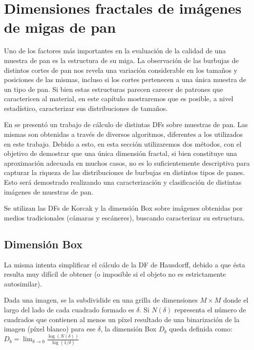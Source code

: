 \section{Dimensiones fractales de imágenes de migas de pan}

Uno de los factores más importantes en la evaluación de la calidad de una muestra de pan es la estructura de su miga.
La observación de las burbujas de distintos cortes de pan nos revela una variación considerable en los tamaños y posiciones de las mismas, incluso si los cortes pertenecen a una única muestra de un tipo de pan.
Si bien estas estructuras parecen carecer de patrones que caractericen al material, en este capítulo mostraremos que es posible, a nivel estadístico, caracterizar sus distribuciones de tamaños.

En \cite{Gonzales2008} se present\'o un trabajo de c\'alculo de distintas DFs sobre muestras de pan.
Las mismas son obtenidas a trav\'es de diversos algoritmos, diferentes a los utilizados en este trabajo.
Debido a esto, en esta sección utilizaremos dos métodos, con el objetivo de demostrar que una única dimensión fractal, si bien constituye una aproximación adecuada en muchos casos, no es lo suficientemente descriptiva para capturar la riqueza de las distribuciones de burbujas en distintos tipos de panes.
Esto será demostrado realizando una caracterización y clasificación de distintas imágenes de muestras de pan. 

Se utilizan las DFs de Korcak \cite{Mandelbrot1983} y la dimensi\'on Box \cite{Peitgen2004} sobre imágenes obtenidas por medios tradicionales (cámaras y escáneres), buscando caracterizar su estructura.


\subsection{Dimensi\'on Box}
La misma intenta simplificar el c\'alculo de la DF de Hausdorff, debido a que \'esta resulta muy dif\'icil de obtener \cite{Peitgen2004} (o imposible si el objeto no es estrictamente autosimilar).

Dada una imagen, se la subdividide en una grilla de dimensiones $M\times M$ donde el largo del lado de cada cuadrado formado es $\delta$. Si $N(\delta)$ representa el n\'umero de cuadrados que contienen al menos un p\'ixel resultado de una binarizaci\'on de la imagen (p\'ixel blanco) para ese $\delta$, la dimensi\'on Box $D_{b}$ queda definida como:\\

$D_{b} = \displaystyle\lim_{\delta \to 0}{\frac{\log(N(\delta))}{\log (1/\delta)}}$\\

